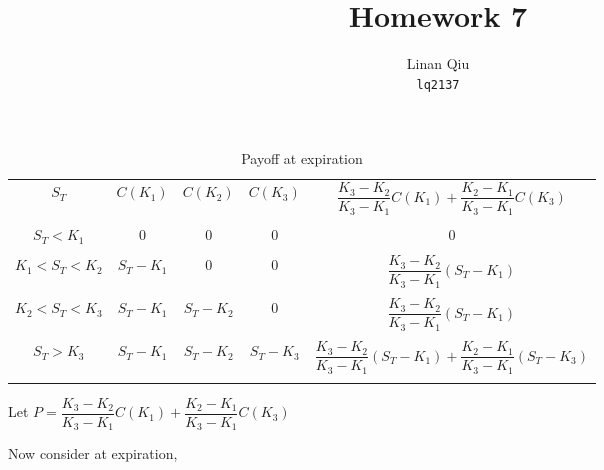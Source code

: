 \documentclass[11pt]{scrartcl}
\title{Homework 7}
\author{Linan Qiu\\\texttt{lq2137}}
\newcommand{\portfolio}[2]{\ensuremath{\dfrac{K_3-K_2}{K_3-K_1}#1 + \dfrac{K_2-K_1}{K_3-K_1}#2}}
\newcommand{\leftportfolio}[1]{\ensuremath{\dfrac{K_3-K_2}{K_3-K_1}#1}}
\begin{document}
\maketitle

\section{}

\begin{table}[H] \centering 
\begin{tabu}{ccccc} 
\toprule
$S_T$ & $C(K_1)$ & $C(K_2)$ & $C(K_3)$ & $\portfolio{C(K_1)}{C(K_3)}$\\[0.1ex] \\
\midrule
$S_T < K_1$ & 0 & 0 & 0 & 0\\[0.1ex] \\
$K_1 < S_T < K_2$ & $S_T - K_1$ & 0 & 0 & $\leftportfolio{(S_T - K_1)}$\\[0.1ex] \\
$K_2 < S_T < K_3$ & $S_T - K_1$ & $S_T - K_2$ & 0 & $\leftportfolio{(S_T - K_1)}$\\[0.1ex] \\
$S_T > K_3$ & $S_T - K_1$ & $S_T - K_2$ & $S_T - K_3$ & $\portfolio{(S_T - K_1)}{(S_T - K_3)}$\\[0.1ex] \\
\bottomrule
\end{tabu} 
  \caption{Payoff at expiration} 
  \label{table:payoff} 
\end{table}

Let $P = \portfolio{C(K_1)}{C(K_3)}$

Now consider at expiration,
\end{document}
